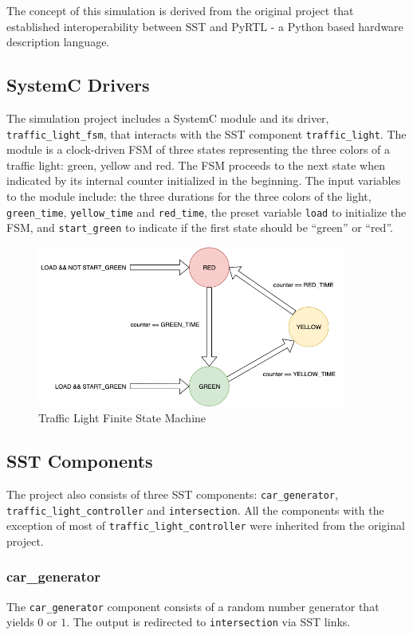 \documentclass{article}
\begin{document}
  The concept of this simulation is derived from the original project that established
  interoperability between SST and PyRTL - a Python based hardware description
  language.\cite{pyrtl-sst}

    \subsection{SystemC Drivers}
    The simulation project includes a SystemC module and its driver, \lstinline{traffic_light_fsm},
    that interacts with the SST component \lstinline{traffic_light}. The module is a clock-driven
    FSM of three states representing the three colors of a traffic light: green, yellow and red. The
    FSM proceeds to the next state when indicated by its internal counter initialized in the
    beginning. The input variables to the module include: the three durations for the three colors
    of the light, \lstinline{green_time}, \lstinline{yellow_time} and \lstinline{red_time}, the
    preset variable \lstinline{load} to initialize the FSM, and \lstinline{start_green} to indicate
    if the first state should be ``green'' or ``red''.

    \begin{figure}[!h]
      \centering
      \includegraphics[width=4in]{fsm.png}
      \caption{Traffic Light Finite State Machine}
      \label{fig:fig2}
    \end{figure}

    \subsection{SST Components}
    The project also consists of three SST components: \lstinline{car_generator},
    \lstinline{traffic_light_controller} and \lstinline{intersection}. All the components with the
    exception of most of \lstinline{traffic_light_controller} were inherited from the original
    project.

      \subsubsection{car\_generator}
      The \lstinline{car_generator} component consists of a random number generator that yields $0$
      or $1$. The output is redirected to \lstinline{intersection} via SST links.
\end{document}
